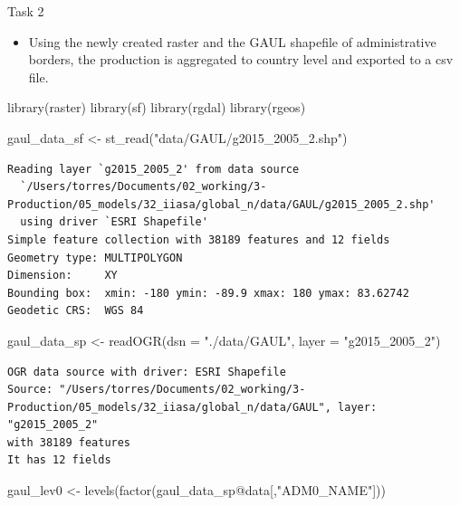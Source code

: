 \documentclass[
  ignorenonframetext,
  aspectratio=169,
]{beamer}
\newenvironment{Shaded}{\begin{snugshade}}{\end{snugshade}}
\newcommand{\AttributeTok}[1]{\textcolor[rgb]{0.40,0.45,0.13}{#1}}
\newcommand{\FunctionTok}[1]{\textcolor[rgb]{0.28,0.35,0.67}{#1}}
\newcommand{\NormalTok}[1]{\textcolor[rgb]{0.00,0.23,0.31}{#1}}
\newcommand{\OtherTok}[1]{\textcolor[rgb]{0.00,0.23,0.31}{#1}}
\newcommand{\SpecialCharTok}[1]{\textcolor[rgb]{0.37,0.37,0.37}{#1}}
\newcommand{\StringTok}[1]{\textcolor[rgb]{0.13,0.47,0.30}{#1}}
\providecommand{\tightlist}{%
  \setlength{\itemsep}{0pt}\setlength{\parskip}{0pt}}\usepackage{longtable,booktabs,array}
\begin{document}
\begin{frame}[fragile]{Task 2}
\protect\hypertarget{task-2}{}
\begin{itemize}[<+->]
\tightlist
\item
  Using the newly created raster and the GAUL shapefile of
  administrative borders, the production is aggregated to country level
  and exported to a csv file.
\end{itemize}

\linespread{0.5}

\begin{Shaded}
\begin{Highlighting}[]
\FunctionTok{library}\NormalTok{(raster)}
\FunctionTok{library}\NormalTok{(sf)}
\FunctionTok{library}\NormalTok{(rgdal)}
\FunctionTok{library}\NormalTok{(rgeos)}


\NormalTok{gaul\_data\_sf }\OtherTok{\textless{}{-}} \FunctionTok{st\_read}\NormalTok{(}\StringTok{"data/GAUL/g2015\_2005\_2.shp"}\NormalTok{)}
\end{Highlighting}
\end{Shaded}

\begin{verbatim}
Reading layer `g2015_2005_2' from data source 
  `/Users/torres/Documents/02_working/3-Production/05_models/32_iiasa/global_n/data/GAUL/g2015_2005_2.shp' 
  using driver `ESRI Shapefile'
Simple feature collection with 38189 features and 12 fields
Geometry type: MULTIPOLYGON
Dimension:     XY
Bounding box:  xmin: -180 ymin: -89.9 xmax: 180 ymax: 83.62742
Geodetic CRS:  WGS 84
\end{verbatim}

\begin{Shaded}
\begin{Highlighting}[]
\NormalTok{gaul\_data\_sp }\OtherTok{\textless{}{-}} \FunctionTok{readOGR}\NormalTok{(}\AttributeTok{dsn =} \StringTok{"./data/GAUL"}\NormalTok{, }\AttributeTok{layer =} \StringTok{"g2015\_2005\_2"}\NormalTok{)}
\end{Highlighting}
\end{Shaded}

\begin{verbatim}
OGR data source with driver: ESRI Shapefile 
Source: "/Users/torres/Documents/02_working/3-Production/05_models/32_iiasa/global_n/data/GAUL", layer: "g2015_2005_2"
with 38189 features
It has 12 fields
\end{verbatim}

\begin{Shaded}
\begin{Highlighting}[]
\NormalTok{gaul\_lev0 }\OtherTok{\textless{}{-}} \FunctionTok{levels}\NormalTok{(}\FunctionTok{factor}\NormalTok{(gaul\_data\_sp}\SpecialCharTok{@}\NormalTok{data[,}\StringTok{"ADM0\_NAME"}\NormalTok{]))}


\end{Highlighting}
\end{Shaded}
\end{frame}
\end{document}
